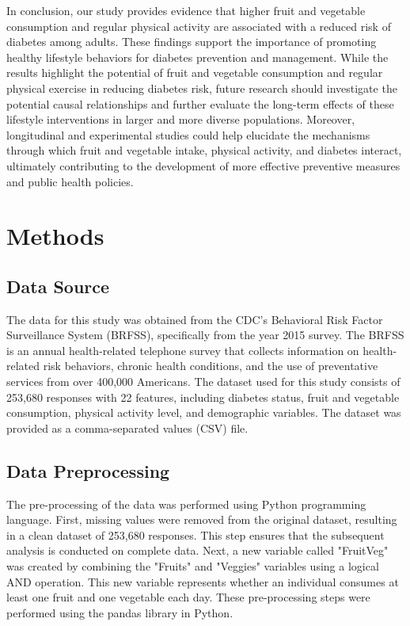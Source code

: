 \documentclass[11pt]{article}
\begin{document}
In conclusion, our study provides evidence that higher fruit and vegetable consumption and regular physical activity are associated with a reduced risk of diabetes among adults. These findings support the importance of promoting healthy lifestyle behaviors for diabetes prevention and management. While the results highlight the potential of fruit and vegetable consumption and regular physical exercise in reducing diabetes risk, future research should investigate the potential causal relationships and further evaluate the long-term effects of these lifestyle interventions in larger and more diverse populations. Moreover, longitudinal and experimental studies could help elucidate the mechanisms through which fruit and vegetable intake, physical activity, and diabetes interact, ultimately contributing to the development of more effective preventive measures and public health policies.

\section*{Methods}

\subsection*{Data Source}
The data for this study was obtained from the CDC's Behavioral Risk Factor Surveillance System (BRFSS), specifically from the year 2015 survey. The BRFSS is an annual health-related telephone survey that collects information on health-related risk behaviors, chronic health conditions, and the use of preventative services from over 400,000 Americans. The dataset used for this study consists of 253,680 responses with 22 features, including diabetes status, fruit and vegetable consumption, physical activity level, and demographic variables. The dataset was provided as a comma-separated values (CSV) file.

\subsection*{Data Preprocessing}
The pre-processing of the data was performed using Python programming language. First, missing values were removed from the original dataset, resulting in a clean dataset of 253,680 responses. This step ensures that the subsequent analysis is conducted on complete data. Next, a new variable called "FruitVeg" was created by combining the "Fruits" and "Veggies" variables using a logical AND operation. This new variable represents whether an individual consumes at least one fruit and one vegetable each day. These pre-processing steps were performed using the pandas library in Python.
\end{document}
